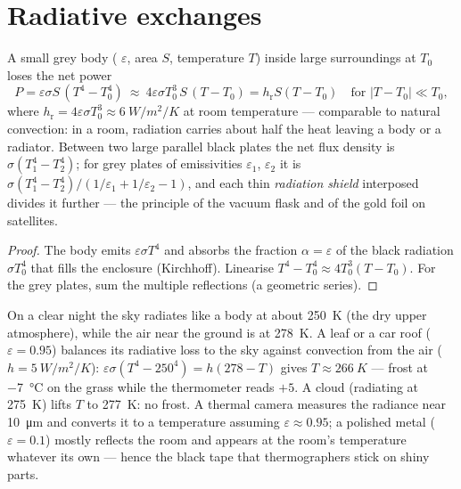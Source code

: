 \section{Radiative exchanges}

\begin{proposition}\label{prop:b2:thermal-radiation:exchange}
A small grey body ( $\varepsilon$, area $S$, temperature $T$)
inside large surroundings at $T_0$ loses the net power
\[
P = \varepsilon\sigma S\,(T^4 - T_0^4)
\ \approx\ 4\varepsilon\sigma T_0^3\,S\,(T - T_0) = h_{\text{r}}S(T - T_0)
\quad\text{for } |T - T_0| \ll T_0 ,
\]
where $h_{\text{r}} = 4\varepsilon\sigma T_0^3 \approx \qty{6}{W/m^2/K}$ at
room temperature --- comparable to natural convection: in a room,
radiation carries about half the heat leaving a body or a radiator.
Between two large parallel black plates the net flux density is
$\sigma(T_1^4 - T_2^4)$; for grey plates of emissivities $\varepsilon_1$,
$\varepsilon_2$ it is $\sigma(T_1^4 - T_2^4)/(1/\varepsilon_1 + 1/\varepsilon_2
- 1)$, and each thin \emph{radiation shield} interposed divides it
further --- the principle of the vacuum flask and of the gold foil on
satellites.
\end{proposition}

\begin{proof}
The body emits $\varepsilon\sigma T^4$ and absorbs the fraction $\alpha =
\varepsilon$ of the black radiation $\sigma T_0^4$ that fills the enclosure
(Kirchhoff). Linearise $T^4 - T_0^4 \approx 4T_0^3(T - T_0)$. For the
grey plates, sum the multiple reflections (a geometric series).
\end{proof}

\begin{example}\label{ex:b2:thermal-radiation:frost}
On a clear night the sky radiates like a body at about \qty{250}{K}
(the dry upper atmosphere), while the air near the ground is at
\qty{278}{K}. A leaf or a car roof ($\varepsilon = 0.95$) balances its
radiative loss to the sky against convection from the air ($h =
\qty{5}{W/m^2/K}$): $\varepsilon\sigma(T^4 - 250^4) = h(278 - T)$ gives $T
\approx \qty{266}{K}$ --- frost at \qty{-7}{\celsius} on the grass while
the thermometer reads $+5$. A cloud (radiating at \qty{275}{K}) lifts $T$
to \qty{277}{K}: no frost. A thermal camera measures the radiance near
\qty{10}{\micro m} and converts it to a temperature assuming
$\varepsilon \approx 0.95$; a polished metal ($\varepsilon = 0.1$) mostly
reflects the room and appears at the room's temperature whatever its
own --- hence the black tape that thermographers stick on shiny parts.
\end{example}

